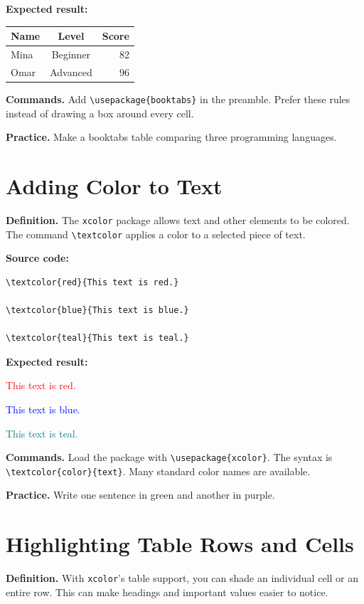\documentclass[11pt]{article}
\begin{document}
\textbf{Expected result:}
\begin{center}
\begin{tabular}{lcr}
\toprule
Name & Level & Score \\
\midrule
Mina & Beginner & 82 \\
Omar & Advanced & 96 \\
\bottomrule
\end{tabular}
\end{center}

\textbf{Commands.} Add \texttt{\textbackslash usepackage\{booktabs\}} in the preamble. Prefer these rules instead of drawing a box around every cell.

\textbf{Practice.} Make a booktabs table comparing three programming languages.

\section{Adding Color to Text}
\textbf{Definition.} The \texttt{xcolor} package allows text and other elements to be colored. The command \texttt{\textbackslash textcolor} applies a color to a selected piece of text.

\textbf{Source code:}
\begin{verbatim}
\textcolor{red}{This text is red.}

\textcolor{blue}{This text is blue.}

\textcolor{teal}{This text is teal.}
\end{verbatim}

\textbf{Expected result:}

\textcolor{red}{This text is red.}

\textcolor{blue}{This text is blue.}

\textcolor{teal}{This text is teal.}

\textbf{Commands.} Load the package with \texttt{\textbackslash usepackage\{xcolor\}}. The syntax is \texttt{\textbackslash textcolor\{color\}\{text\}}. Many standard color names are available.

\textbf{Practice.} Write one sentence in green and another in purple.

\section{Highlighting Table Rows and Cells}
\textbf{Definition.} With \texttt{xcolor}'s table support, you can shade an individual cell or an entire row. This can make headings and important values easier to notice.
\end{document}
